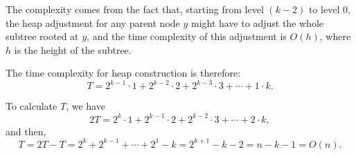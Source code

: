 \documentclass[11pt, oneside]{article}   	%
\begin{document}
The complexity comes from the fact that, starting from level $(k-2)$ to level 0, the heap adjustment for any parent node $y$ might have to adjust the whole subtree rooted at $y$, and the time complexity of this adjustment is $O(h)$, where $h$ is the height of the subtree.

The time complexity for heap construction is therefore:
\[T = 2^{k-1} \cdot 1 + 2^{k-2}\cdot 2 + 2^{k-3}\cdot 3 + \cdots + 1\cdot k.\]

To calculate $T$, we have
\[2T = 2^k \cdot 1 + 2^{k-1}\cdot 2 + 2^{k-2}\cdot 3 + \cdots + 2\cdot k,\]
and then,
\[T = 2T - T = 2^k + 2^{k-1} + \cdots + 2^1 - k = 2^{k+1} - k - 2 =  n - k -1 = O(n).\]
\end{document}
